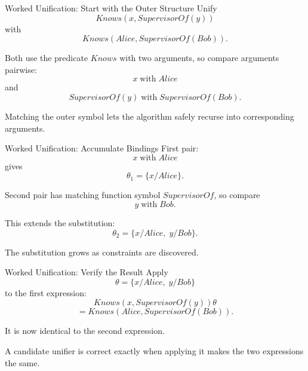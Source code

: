 \documentclass[aspectratio=169,10pt]{beamer}
\begin{document}
\begin{frame}[shrink=10]{Worked Unification: Start with the Outer Structure}
  Unify
  \[
    Knows(x,SupervisorOf(y))
  \]
  with
  \[
    Knows(Alice,SupervisorOf(Bob)).
  \]

  Both use the predicate $Knows$ with two arguments, so compare arguments pairwise:
  \[
    x \;\text{with}\; Alice
  \]
  and
  \[
    SupervisorOf(y) \;\text{with}\; SupervisorOf(Bob).
  \]

  \begin{keyidea}
    Matching the outer symbol lets the algorithm safely recurse into corresponding arguments.
  \end{keyidea}
\end{frame}

\begin{frame}[shrink=10]{Worked Unification: Accumulate Bindings}
  First pair:
  \[
    x \;\text{with}\; Alice
  \]
  gives
  \[
    \theta_1 = \{x/Alice\}.
  \]

  Second pair has matching function symbol $SupervisorOf$, so compare
  \[
    y \;\text{with}\; Bob.
  \]

  This extends the substitution:
  \[
    \theta_2 = \{x/Alice,\;y/Bob\}.
  \]

  \begin{keyidea}
    The substitution grows as constraints are discovered.
  \end{keyidea}
\end{frame}

\begin{frame}[shrink=10]{Worked Unification: Verify the Result}
  Apply
  \[
    \theta = \{x/Alice,\;y/Bob\}
  \]
  to the first expression:
  \[
    Knows(x,SupervisorOf(y))\theta
  \]
  \[
    = Knows(Alice,SupervisorOf(Bob)).
  \]

  It is now identical to the second expression.

  \begin{keyidea}
    A candidate unifier is correct exactly when applying it makes the two expressions the same.
  \end{keyidea}
\end{frame}
\end{document}
